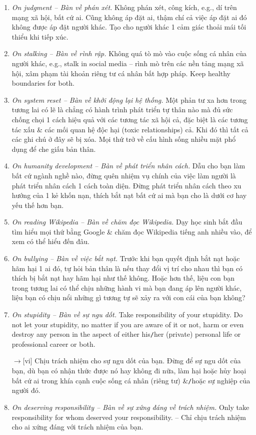 \documentclass[12pt,twoside]{book}
\begin{document}
\begin{enumerate}
	\item {\it On judgment -- Bàn về phán xét.} Không phán xét, công kích, e.g., dí trên mạng xã hội, bất cứ ai. Cũng không áp đặt ai, thậm chí cả việc áp đặt ai đó không được áp đặt người khác. Tạo cho người khác 1 cảm giác thoải mái tối thiểu khi tiếp xúc.
	\item {\it On stalking -- Bàn về rình rập.} Không quá tò mò vào cuộc sống cá nhân của người khác, e.g., stalk in social media -- rình mò trên các nền tảng mạng xã hội, xâm phạm tài khoản  riêng tư cá nhân bất hợp pháp. Keep healthy boundaries for both.
	\item {\it On system reset -- Bàn về khởi động lại hệ thống.} Một phản tư xa hơn trong tương lai có lẽ là chẳng có hành trình phát triển tự thân nào mà đủ sức chống chọi 1 cách hiệu quả với các tương tác xã hội cả, đặc biệt là các tương tác xấu \& các mối quan hệ độc hại (toxic relationships) cả. Khi đó thì tất cả các ghi chú ở đây sẽ bị xóa. Mọi thứ trở về cấu hình sống nhiều mặt phổ dụng để che giấu bản thân.	
	\item {\it On humanity development -- Bàn về phát triển nhân cách.} Dẫu cho bạn làm bất cứ ngành nghề nào, đừng quên nhiệm vụ chính của việc làm người là phát triển nhân cách 1 cách toàn diện. Đừng phát triển nhân cách theo xu hướng của 1 kẻ khốn nạn, thích bắt nạt bất cứ ai mà bạn cho là dưới cơ hay yếu thế hơn bạn.
	\item {\it On reading Wikipedia -- Bàn về chăm đọc Wikipedia.} Dạy học sinh bắt đầu tìm hiểu mọi thứ bằng Google \& chăm đọc Wikipedia tiếng anh nhiều vào, để xem có thể hiểu đến đâu.
	\item {\it On bullying -- Bàn về việc bắt nạt.} Trước khi bạn quyết định bắt nạt hoặc hãm hại 1 ai đó, tự hỏi bản thân là nếu thay đổi vị trí cho nhau thì bạn có thích bị bắt nạt hay hãm hại như thế không. Hoặc hơn thế, liệu con bạn trong tương lai có thể chịu những hành vi mà bạn đang áp lên người khác, liệu bạn có chịu nổi những gì tương tự sẽ xảy ra với con cái của bạn không?
	\item {\it On stupidity -- Bàn về sự ngu dốt.} Take responsibility of your stupidity. Do not let your stupidity, no matter if you are aware of it or not, harm or even destroy any person in the aspect of either his{\tt/}her (private) personal life or professional career or both.
	
	{\sf[en]$\to$[vi]} Chịu trách nhiệm cho sự ngu dốt của bạn. Đừng để sự ngu dốt của bạn, dù bạn có nhận thức được nó hay không đi nữa, làm hại hoặc hủy hoại bất cứ ai trong khía cạnh cuộc sống cá nhân (riêng tư) \&{\tt/}hoặc sự nghiệp của người đó.
	\item {\it On deserving responsibility -- Bàn về sự xứng đáng về trách nhiệm.} Only take responsibility for whom deserved your responsibility. -- Chỉ chịu trách nhiệm cho ai xứng đáng với trách nhiệm của bạn.
\end{enumerate}
\end{document}

